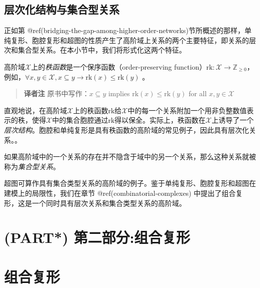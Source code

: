\documentclass[
  12pt,
]{krantz}
\begin{document}
\subsection{层次化结构与集合型关系}\label{hierarchical-structure-and-set-type-relations}

正如第
@ref(bridging-the-gap-among-higher-order-networks)节所概述的那样，单纯复形、胞腔复形和超图的性质产生了高阶域上关系的两个主要特征，即关系的层次和集合型关系。在本小节中，我们将形式化这两个特征。

\label{rank}
高阶域\(\mathcal{X}\)上的\emph{秩函数}是一个保序函数（order-preserving
function）\(\mbox{rk}\colon \mathcal{X}\to \mathbb{Z}_{\ge 0}\)，例如，\(\forall x,y\in\mathcal{X}, x\subseteq y\rightarrow \mbox{rk}(x) \leq \mbox{rk}(y)\)
。

\begin{glossarybox}

\begin{quote}
\textbf{译者注} 原书中写作：\(x\subseteq  y\) implies
\(\mbox{rk}(x) \leq \mbox{rk}(y)\) for all \(x,y\in\mathcal{X}\)
\end{quote}

\end{glossarybox}

直观地说，在高阶域\(\mathcal{X}\)上的秩函数\(\mbox{rk}\)给\(\mathcal{X}\)中的每一个关系附加一个用非负整数值表示的秩，使得\(\mathcal{X}\)中的集合胞腔通过\(\mbox{rk}\)得以保全。实际上，秩函数在\(\mathcal{X}\)上诱导了一个\emph{层次结构}。胞腔和单纯复形是具有秩函数的高阶域的常见例子，因此具有层次化关系。。

\label{strelations}
如果高阶域中的一个关系的存在并不隐含于域中的另一个关系，那么这种关系就被称为\emph{集合型关系}。

超图可算作具有集合类型关系的高阶域的例子。鉴于单纯复形、胞腔复形和超图在建模上的局限性，我们在章节
@ref(combinatorial-complexes)
中提出了组合复形，这是一个同时具有层次关系和集合类型关系的高阶域。

\section*{(PART*)
第二部分:组合复形}\label{part-ux7b2cux4e8cux90e8ux5206ux7ec4ux5408ux590dux5f62}

\section{组合复形}\label{combinatorial-complexes}
\end{document}
